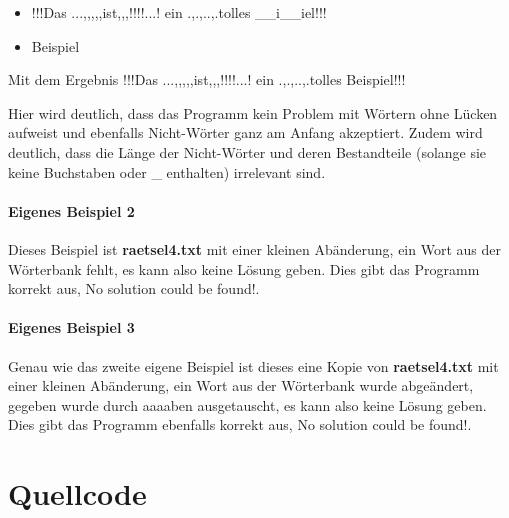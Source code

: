 \documentclass[a4paper,10pt,ngerman]{scrartcl}
\begin{document}
\begin{itemize}
    \item[] !!!Das ...,,,,,ist,,,!!!!...! ein .,.,..,.tolles \_\_i\_\_iel!!!
    \item[] Beispiel
\end{itemize}

Mit dem Ergebnis \glqq !!!Das ...,,,,,ist,,,!!!!...! ein .,.,..,.tolles Beispiel!!!\grqq{}

Hier wird deutlich, dass das Programm kein Problem mit Wörtern ohne Lücken aufweist und ebenfalls Nicht-Wörter ganz am Anfang akzeptiert. Zudem wird deutlich, dass die Länge der Nicht-Wörter und deren Bestandteile (solange sie keine Buchstaben oder \glqq \_\grqq{} enthalten) irrelevant sind.

\paragraph{Eigenes Beispiel 2}
Dieses Beispiel ist \textbf{raetsel4.txt} mit einer kleinen Abänderung, ein Wort aus der Wörterbank fehlt, es kann also keine Lösung geben. Dies gibt das Programm korrekt aus, \glqq No solution could be found!\grqq{}.

\paragraph{Eigenes Beispiel 3}
Genau wie das zweite eigene Beispiel ist dieses eine Kopie von \textbf{raetsel4.txt} mit einer kleinen Abänderung, ein Wort aus der Wörterbank wurde abgeändert, \glqq gegeben\grqq{} wurde durch \glqq aaaaben\grqq{} ausgetauscht, es kann also keine Lösung geben. Dies gibt das Programm ebenfalls korrekt aus, \glqq No solution could be found!\grqq{}.

\section{Quellcode}
\end{document}
